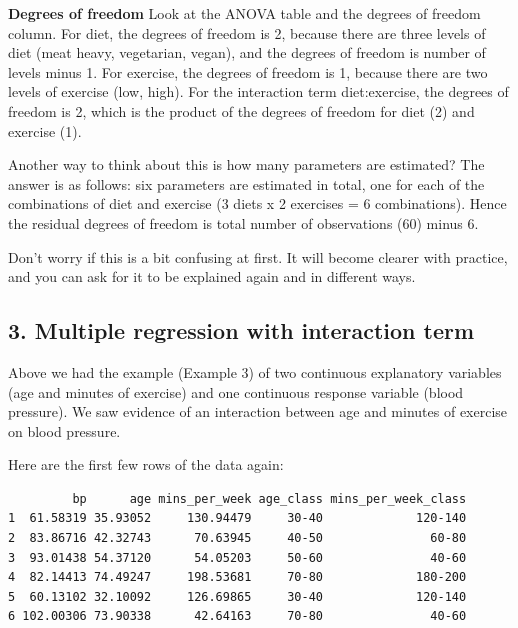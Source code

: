 \documentclass[
  letterpaper,
  8pt,
  a4paper]{book}
\begin{document}
\begin{tcolorbox}[enhanced jigsaw, arc=.35mm, bottomrule=.15mm, bottomtitle=1mm, breakable, colback=white, colbacktitle=quarto-callout-caution-color!10!white, colframe=quarto-callout-caution-color-frame, coltitle=black, left=2mm, leftrule=.75mm, opacityback=0, opacitybacktitle=0.6, rightrule=.15mm, title=\textcolor{quarto-callout-caution-color}{\faFire}\hspace{0.5em}{Caution}, titlerule=0mm, toprule=.15mm, toptitle=1mm]

\textbf{Degrees of freedom} Look at the ANOVA table and the degrees of
freedom column. For diet, the degrees of freedom is 2, because there are
three levels of diet (meat heavy, vegetarian, vegan), and the degrees of
freedom is number of levels minus 1. For exercise, the degrees of
freedom is 1, because there are two levels of exercise (low, high). For
the interaction term diet:exercise, the degrees of freedom is 2, which
is the product of the degrees of freedom for diet (2) and exercise (1).

Another way to think about this is how many parameters are estimated?
The answer is as follows: six parameters are estimated in total, one for
each of the combinations of diet and exercise (3 diets x 2 exercises = 6
combinations). Hence the residual degrees of freedom is total number of
observations (60) minus 6.

Don't worry if this is a bit confusing at first. It will become clearer
with practice, and you can ask for it to be explained again and in
different ways.

\end{tcolorbox}

\subsection*{3. Multiple regression with interaction
term}\label{multiple-regression-with-interaction-term}

Above we had the example (Example 3) of two continuous explanatory
variables (age and minutes of exercise) and one continuous response
variable (blood pressure). We saw evidence of an interaction between age
and minutes of exercise on blood pressure.

Here are the first few rows of the data again:

\begin{verbatim}
         bp      age mins_per_week age_class mins_per_week_class
1  61.58319 35.93052     130.94479     30-40             120-140
2  83.86716 42.32743      70.63945     40-50               60-80
3  93.01438 54.37120      54.05203     50-60               40-60
4  82.14413 74.49247     198.53681     70-80             180-200
5  60.13102 32.10092     126.69865     30-40             120-140
6 102.00306 73.90338      42.64163     70-80               40-60
\end{verbatim}
\end{document}
